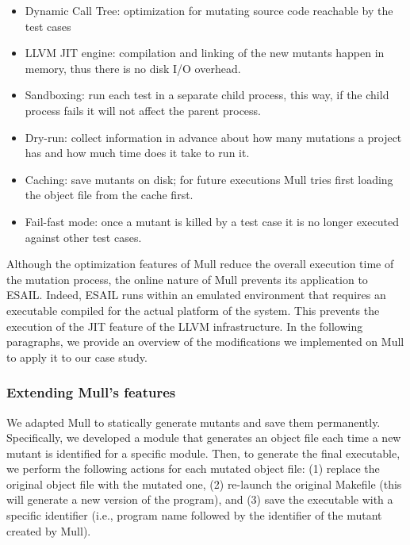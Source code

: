 \begin{itemize}
	\item Dynamic Call Tree: optimization for mutating source code reachable by the test cases
	\item LLVM JIT engine: compilation and linking of the new mutants happen in memory, thus there is no disk I/O overhead.
	\item Sandboxing: run each test in a separate child process, this way, if the child process fails it will not affect the parent process.
	\item Dry-run: collect information in advance about how many mutations a project has and how much time does it take to run it.
	\item Caching: save mutants on disk; for future executions Mull tries first loading the object file from the cache first.
	\item Fail-fast mode: once a mutant is killed by a test case it is no longer executed against other test cases.
\end{itemize}

Although the optimization features of Mull reduce the overall execution time of the mutation process, the online nature of Mull prevents its application to ESAIL. Indeed, ESAIL runs within an emulated environment that requires an executable compiled for the actual platform of the system. This prevents the execution of the JIT feature of the LLVM infrastructure. In the following paragraphs, we provide an overview of the modifications we implemented on Mull to apply it to our case study.

\subsubsection{Extending Mull's features}


We adapted Mull to statically generate mutants and save them permanently. Specifically, we developed a module that generates an object file each time a new mutant is identified for a specific module. Then, to generate the final executable, we perform the following actions for each mutated object file: (1) replace the original object file with the mutated one, (2) re-launch the original Makefile (this will generate a new version of the program), and (3) save the executable with a specific identifier (i.e., program name followed by the identifier of the mutant created by Mull).

